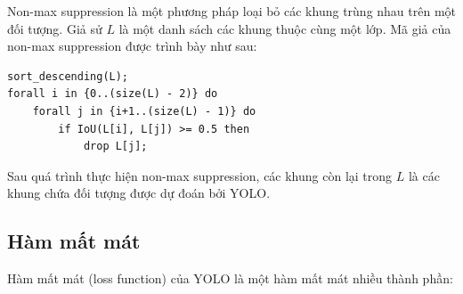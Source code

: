 \documentclass[../thesis.tex]{subfiles}
\begin{document}
Non-max suppression là một phương pháp loại bỏ các khung trùng nhau trên một đối tượng. Giả sử $L$ là một danh sách các khung thuộc cùng một lớp. Mã giả của non-max suppression được trình bày như sau:

\begin{Verbatim}
sort_descending(L);
forall i in {0..(size(L) - 2)} do
    forall j in {i+1..(size(L) - 1)} do
        if IoU(L[i], L[j]) >= 0.5 then
            drop L[j];
\end{Verbatim}

Sau quá trình thực hiện non-max suppression, các khung còn lại trong $L$ là các khung chứa đối tượng được dự đoán bởi YOLO.

\subsection{Hàm mất mát}

Hàm mất mát (loss function) của YOLO là một hàm mất mát nhiều thành phần:
\end{document}
